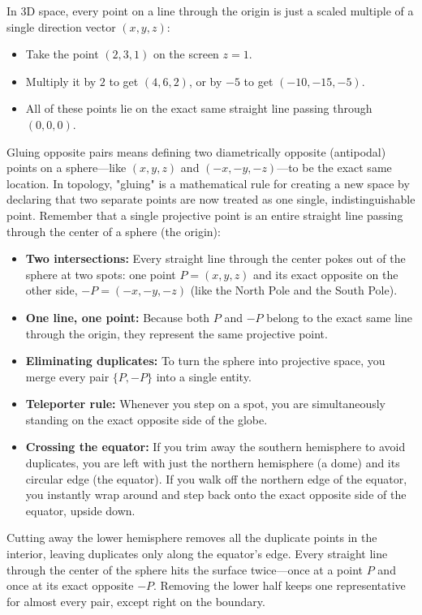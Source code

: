 \documentclass{report}
\begin{document}
\begin{itemize}
            \bigbreak \noindent 
            In 3D space, every point on a line through the origin is just a scaled multiple of a single direction vector \((x, y, z)\):
            \begin{itemize}
                \item Take the point \((2, 3, 1)\) on the screen \(z = 1\).
                \item Multiply it by \(2\) to get \((4, 6, 2)\), or by \(-5\) to get \((-10, -15, -5)\).
                \item All of these points lie on the exact same straight line passing through \((0, 0, 0)\).
            \end{itemize}
            Gluing opposite pairs means defining two diametrically opposite (antipodal) points on a sphere—like \((x, y, z)\) and \((-x, -y, -z)\)—to be the exact same location.
            \bigbreak \noindent 
            In topology, "gluing" is a mathematical rule for creating a new space by declaring that two separate points are now treated as one single, indistinguishable point.
            \bigbreak \noindent 
            Remember that a single projective point is an entire straight line passing through the center of a sphere (the origin):
            \begin{itemize}
                \item \textbf{Two intersections:} Every straight line through the center pokes out of the sphere at two spots: one point \(P = (x, y, z)\) and its exact opposite on the other side, \(-P = (-x, -y, -z)\) (like the North Pole and the South Pole).
                \item \textbf{One line, one point:} Because both \(P\) and \(-P\) belong to the exact same line through the origin, they represent the same projective point.
                \item \textbf{Eliminating duplicates:} To turn the sphere into projective space, you merge every pair \(\{P, -P\}\) into a single entity.
            \end{itemize}
            \begin{itemize}
                \item \textbf{Teleporter rule:} Whenever you step on a spot, you are simultaneously standing on the exact opposite side of the globe.
                \item \textbf{Crossing the equator:} If you trim away the southern hemisphere to avoid duplicates, you are left with just the northern hemisphere (a dome) and its circular edge (the equator). If you walk off the northern edge of the equator, you instantly wrap around and step back onto the exact opposite side of the equator, upside down.
            \end{itemize}
            Cutting away the lower hemisphere removes all the duplicate points in the interior, leaving duplicates only along the equator's edge.
            \bigbreak \noindent 
            Every straight line through the center of the sphere hits the surface twice—once at a point \(P\) and once at its exact opposite \(-P\). Removing the lower half keeps one representative for almost every pair, except right on the boundary.



\end{itemize}
\end{document}
